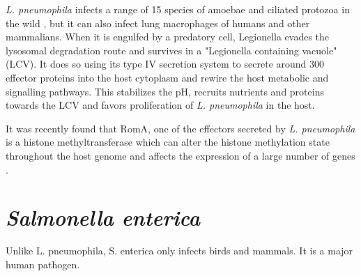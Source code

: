 \textit{L. pneumophila} infects a range of 15 species of amoebae and ciliated protozoa in the wild \cite{Rowbotham1980}, but it can also infect lung macrophages of humans and other mammalians. When it is engulfed by a predatory cell, Legionella evades the lysosomal degradation route and survives in a "Legionella containing vacuole" (LCV). It does so using its type IV secretion system to secrete around 300 effector proteins into the host cytoplasm and rewire the host metabolic and signalling pathways. This stabilizes the pH, recruits nutrients and proteins towards the LCV and favors proliferation of \textit{L. pneumophila} in the host.

It was recently found that RomA, one of the effectors secreted by \textit{L. pneumophila} is a histone methyltransferase which can alter the histone methylation state throughout the host genome and affects the expression of a large number of genes \cite{Rolando2013}.

\section{\textit{Salmonella enterica}}

Unlike {L. pneumophila}, {S. enterica} only infects birds and mammals. It is a major human pathogen.